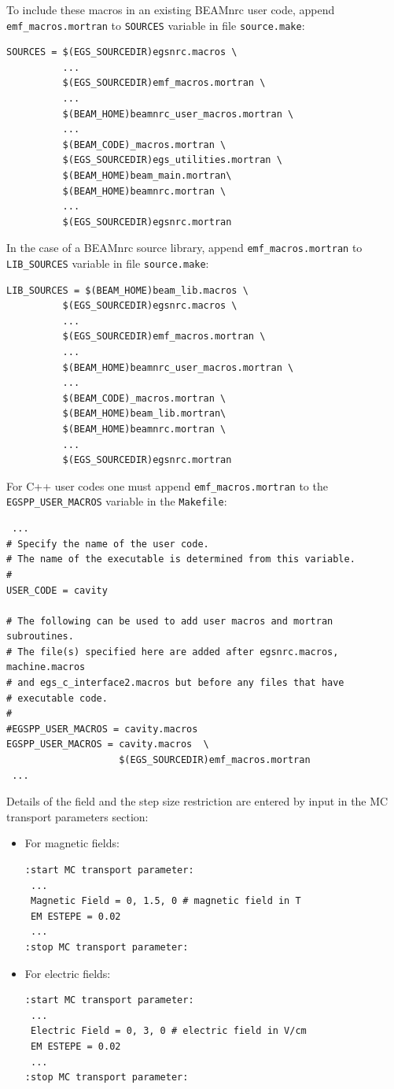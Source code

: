 To include these macros in an existing BEAMnrc user code, append {\tt emf\_macros.mortran} to {\tt SOURCES} variable in file
{\tt source.make}:
\begin{verbatim}
SOURCES = $(EGS_SOURCEDIR)egsnrc.macros \
          ...
          $(EGS_SOURCEDIR)emf_macros.mortran \
          ...
          $(BEAM_HOME)beamnrc_user_macros.mortran \
          ...
          $(BEAM_CODE)_macros.mortran \
          $(EGS_SOURCEDIR)egs_utilities.mortran \
          $(BEAM_HOME)beam_main.mortran\
          $(BEAM_HOME)beamnrc.mortran \
          ...
          $(EGS_SOURCEDIR)egsnrc.mortran

\end{verbatim}
In the case of a BEAMnrc source library, append {\tt emf\_macros.mortran} to {\tt LIB\_SOURCES} variable in file
{\tt source.make}:
\begin{verbatim}
LIB_SOURCES = $(BEAM_HOME)beam_lib.macros \
          $(EGS_SOURCEDIR)egsnrc.macros \
          ...
          $(EGS_SOURCEDIR)emf_macros.mortran \
          ...
          $(BEAM_HOME)beamnrc_user_macros.mortran \
          ...
          $(BEAM_CODE)_macros.mortran \
          $(BEAM_HOME)beam_lib.mortran\
          $(BEAM_HOME)beamnrc.mortran \
          ...
          $(EGS_SOURCEDIR)egsnrc.mortran
\end{verbatim}

For C++ user codes one must append {\tt emf\_macros.mortran} to the {\tt EGSPP\_USER\_MACROS} variable in
the {\tt Makefile}:
\begin{verbatim}
 ...
# Specify the name of the user code.
# The name of the executable is determined from this variable.
#
USER_CODE = cavity

# The following can be used to add user macros and mortran subroutines.
# The file(s) specified here are added after egsnrc.macros, machine.macros
# and egs_c_interface2.macros but before any files that have
# executable code.
#
#EGSPP_USER_MACROS = cavity.macros
EGSPP_USER_MACROS = cavity.macros  \
                    $(EGS_SOURCEDIR)emf_macros.mortran
 ...
\end{verbatim}

Details of the field and the step size restriction are entered by input in the MC transport parameters section:
\begin{itemize}
\item For magnetic fields:
\begin{verbatim}
:start MC transport parameter:
 ...
 Magnetic Field = 0, 1.5, 0 # magnetic field in T
 EM ESTEPE = 0.02
 ...
:stop MC transport parameter:
\end{verbatim}

\item For electric fields:
\begin{verbatim}
:start MC transport parameter:
 ...
 Electric Field = 0, 3, 0 # electric field in V/cm
 EM ESTEPE = 0.02
 ...
:stop MC transport parameter:
\end{verbatim}
\end{itemize}

